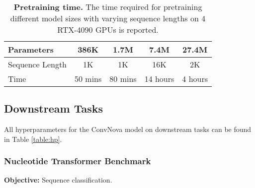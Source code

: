 \begin{table}[h]
\centering
\caption{\textbf{Pretraining time.} The time required for pretraining different model sizes with varying sequence lengths on 4 RTX-4090 GPUs is reported.}
\label{table:pretraintime}
\begin{tabular}{@{}lcccc@{}}
\toprule
\textbf{Parameters}          & \textbf{386K} & \textbf{1.7M} & \textbf{7.4M} & \textbf{27.4M} \\ \midrule
Sequence Length              & 1K            & 1K            & 16K           & 2K             \\
Time                         & 50 mins       & 80 mins       & 14 hours      & 4 hours        \\ \bottomrule
\end{tabular}
\end{table}

\subsection{Downstream Tasks}
All hyperparameters for the ConvNova model on downstream tasks can be found in Table \ref{table:hp}.

\begin{table}[H]
\caption{\textbf{Hyperparameters for ConvNova model on all downstream tasks.} Specific settings for each task include sequence length, dilation rate, hidden dimension, number of GCBs, and model size.} 
\label{table:hp}
\end{table}

\subsubsection{Nucleotide Transformer Benchmark}\label{app:nt}
\textbf{Objective:} Sequence classification.

